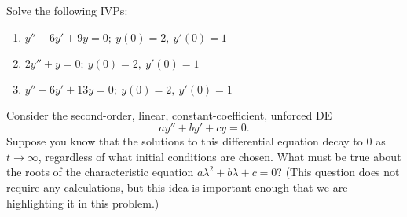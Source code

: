 \documentclass[12pt,letterpaper]{hmcpset}
\begin{document}
\begin{solution}
    \vfill
\end{solution}
\newpage

\begin{problem}[3]
    Solve the following IVPs:

    \begin{enumerate}
        \item $y''-6y'+9y=0;\ y(0)= 2,\ y'(0)=1 $
        \item $2y''+y=0;\ y(0)=2,\ y'(0)=1 $
        \item $y''-6y'+13y=0;\ y(0) = 2,\ y'(0)=1 $ 
    \end{enumerate}
\end{problem}

\begin{solution}
    \vfill
\end{solution}
\newpage

\begin{problem}[4]
    Consider the second-order, linear, constant-coefficient, unforced DE
    \[
        ay''+by'+cy=0.
    \]
    Suppose you know that the solutions to this differential equation decay to 0 as $t\to\infty$, regardless of what initial conditions are chosen. What must be true about the roots of the characteristic equation $a\lambda^2+b\lambda+c=0$? (This question does not require any calculations, but this idea is important enough that we are highlighting it in this problem.)
\end{problem}

\begin{solution}
    \vfill
\end{solution}
\newpage
\end{document}

